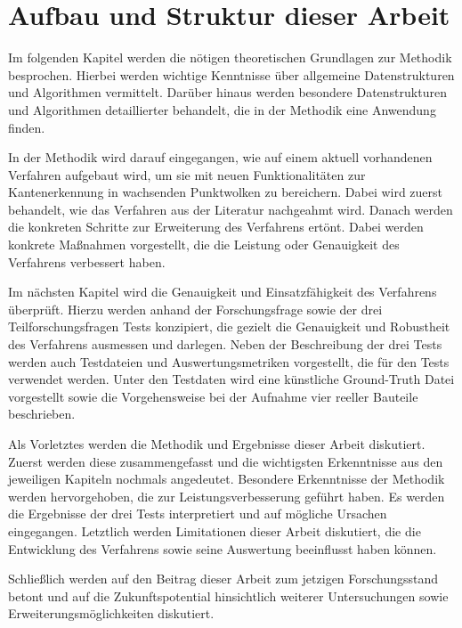 \section{Aufbau und Struktur dieser Arbeit}
Im folgenden Kapitel werden die nötigen theoretischen Grundlagen zur Methodik besprochen. Hierbei werden wichtige Kenntnisse über allgemeine Datenstrukturen und Algorithmen vermittelt. Darüber hinaus werden besondere Datenstrukturen und Algorithmen detaillierter behandelt, die in der Methodik eine Anwendung finden. 

In der Methodik wird darauf eingegangen, wie auf einem aktuell vorhandenen Verfahren aufgebaut wird, um sie mit neuen Funktionalitäten zur Kantenerkennung in wachsenden Punktwolken zu bereichern. Dabei wird zuerst behandelt, wie das Verfahren aus der Literatur nachgeahmt wird. Danach werden die konkreten Schritte zur Erweiterung des Verfahrens ertönt. Dabei werden konkrete Maßnahmen vorgestellt, die die Leistung oder Genauigkeit des Verfahrens verbessert haben. 

Im nächsten Kapitel wird die Genauigkeit und Einsatzfähigkeit des Verfahrens überprüft. Hierzu werden anhand der Forschungsfrage sowie der drei Teilforschungsfragen Tests konzipiert, die gezielt die Genauigkeit und Robustheit des Verfahrens ausmessen und darlegen. Neben der Beschreibung der drei Tests werden auch Testdateien und Auswertungsmetriken vorgestellt, die für den Tests verwendet werden. Unter den Testdaten wird eine künstliche Ground-Truth Datei vorgestellt sowie die Vorgehensweise bei der Aufnahme vier reeller Bauteile beschrieben. 

Als Vorletztes werden die Methodik und Ergebnisse dieser Arbeit diskutiert. Zuerst werden diese zusammengefasst und die wichtigsten Erkenntnisse aus den jeweiligen Kapiteln nochmals angedeutet. Besondere Erkenntnisse der Methodik werden hervorgehoben, die zur Leistungsverbesserung geführt haben. Es werden die Ergebnisse der drei Tests interpretiert und auf mögliche Ursachen eingegangen. Letztlich werden Limitationen dieser Arbeit diskutiert, die die Entwicklung des Verfahrens sowie seine Auswertung beeinflusst haben können. 

Schließlich werden auf den Beitrag dieser Arbeit zum jetzigen Forschungsstand betont und auf die Zukunftspotential hinsichtlich weiterer Untersuchungen sowie Erweiterungsmöglichkeiten diskutiert.